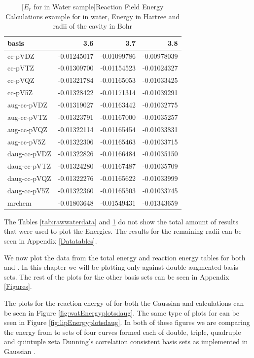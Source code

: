 \documentclass[../Thesis.tex]{subfiles}
\begin{document}
\begin{table}[htbp]
\caption{[$E_r$ for  in Water sample]{Reaction Field Energy Calculations example for  in water, Energy in Hartree and radii of the cavity in Bohr}}
\begin{tabular}{|l|r|r|r|}
basis & 3.6 & 3.7 & 3.8 \\ \hline
cc-pVDZ & -0.01245017 & -0.01099786 & -0.00978039 \\
cc-pVTZ & -0.01309700 & -0.01154523 & -0.01024327 \\
cc-pVQZ & -0.01321784 & -0.01165053 & -0.01033425 \\
cc-pV5Z & -0.01328422 & -0.01171314 & -0.01039291 \\ \hline
aug-cc-pVDZ & -0.01319027 & -0.01163442 & -0.01032775 \\
aug-cc-pVTZ & -0.01323791 & -0.01167000 & -0.01035257 \\
aug-cc-pVQZ & -0.01322114 & -0.01165454 & -0.01033831 \\
aug-cc-pV5Z & -0.01322306 & -0.01165463 & -0.01033715 \\ \hline
daug-cc-pVDZ & -0.01322826 & -0.01166484 & -0.01035150 \\
daug-cc-pVTZ & -0.01324280 & -0.01167487 & -0.01035709 \\
daug-cc-pVQZ & -0.01322276 & -0.01165622 & -0.01033999 \\
daug-cc-pV5Z & -0.01322360 & -0.01165503 & -0.01033745 \\ \hline
mrchem & -0.01803648 & -0.01549431 & -0.01343659 \\
\end{tabular}
\label{tab:Erwatdata}
\end{table}


 The Tables \ref{tab:rawwaterdata} and \ref{tab:Erwatdata} do not show the total
 amount of results that were used to plot the Energies. The results for the remaining
 radii can be seen in Appendix \ref{Datatables}.

We now plot the data from the total energy and reaction energy tables for
both  and . In this chapter we will be plotting only against
double augmented basis sets. The rest of the plots for the other basis sets can
be seen in Appendix \ref{Figures}.

The plots for the reaction energy of  for
both the Gaussian and  \mrchem calculations can be seen in Figure \ref{fig:watEnergyplotsdaug}.
The same type of plots for  can be seen in Figure \ref{fig:lipEnergyplotsdaug}.
In both of these figures we are comparing the energy from \mrchem to sets of four
curves formed each of double, triple, quadruple and quintuple zeta Dunning's correlation
consistent basis sets\cite{doi:10.1063/1.456153} as implemented in Gaussian \cite{G09}.
\end{document}
